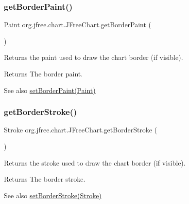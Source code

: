 \subsubsection{\texorpdfstring{get\+Border\+Paint()}{getBorderPaint()}}
{\footnotesize\ttfamily Paint org.\+jfree.\+chart.\+J\+Free\+Chart.\+get\+Border\+Paint (\begin{DoxyParamCaption}{ }\end{DoxyParamCaption})}

Returns the paint used to draw the chart border (if visible).

\begin{DoxyReturn}{Returns}
The border paint.
\end{DoxyReturn}
\begin{DoxySeeAlso}{See also}
\mbox{\hyperlink{classorg_1_1jfree_1_1chart_1_1_j_free_chart_ad6e69d2966aaecdbc060d61a39bf5e1c}{set\+Border\+Paint(\+Paint)}} 
\end{DoxySeeAlso}
\mbox{\label{classorg_1_1jfree_1_1chart_1_1_j_free_chart_a505a44c119435bb9f7b8cb15d6bec167}} 
\subsubsection{\texorpdfstring{get\+Border\+Stroke()}{getBorderStroke()}}
{\footnotesize\ttfamily Stroke org.\+jfree.\+chart.\+J\+Free\+Chart.\+get\+Border\+Stroke (\begin{DoxyParamCaption}{ }\end{DoxyParamCaption})}

Returns the stroke used to draw the chart border (if visible).

\begin{DoxyReturn}{Returns}
The border stroke.
\end{DoxyReturn}
\begin{DoxySeeAlso}{See also}
\mbox{\hyperlink{classorg_1_1jfree_1_1chart_1_1_j_free_chart_a1be1fe771e4369d7b425a77bc8ba3d71}{set\+Border\+Stroke(\+Stroke)}} 
\end{DoxySeeAlso}
\mbox{\label{classorg_1_1jfree_1_1chart_1_1_j_free_chart_a3ae7a5bbe055395e7fcdaef063e11e25}} 
